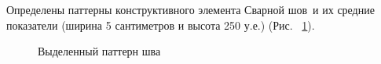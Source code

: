 \documentclass[a4paper,article,14pt]{extarticle}
\begin{document}
Определены паттерны конструктивного элемента \flqq Сварной шов\frqq\, и их средние показатели 
(ширина 5 сантиметров и высота 250 у.е.) (Рис. ~\ref{image4}).
\pagebreak

\begin{figure}[ht]
    \begin{center}
    
    \caption{
    \label{image4}
    Выделенный паттерн шва}
    \end {center}
\end {figure}

\pagebreak
\end{document}
